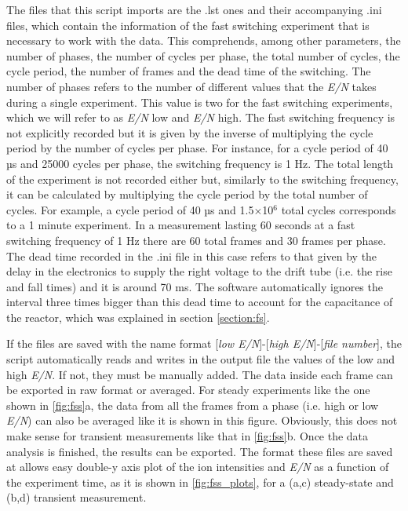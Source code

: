 The files that this script imports are the .lst ones and their accompanying .ini files, which contain the information of the fast switching experiment that is necessary to work with the data.
This  comprehends, among other parameters,
the number of phases,
the number of cycles per phase,
the total number of cycles,
the cycle period,
the number of frames
and
the dead time of the switching.
The number of phases refers to the number of different values that the \textit{E/N} takes during a single experiment. This value is two for the fast switching experiments, which we will refer to as \textit{E/N} low  and \textit{E/N} high.
%
The fast switching frequency is not explicitly recorded but it is given by the inverse of multiplying the cycle period by the number of cycles per phase. For instance, for a cycle period of 40 µs and 25000 cycles per phase, the switching frequency is 1 Hz.
%
The total length of the experiment is not recorded either but, similarly to the switching frequency, it can be calculated by multiplying the cycle period by the total number of cycles. For example, a cycle period of 40 µs and 1.5$\times$10$^6$ total cycles corresponds to a 1 minute experiment.
%
%
In a measurement lasting 60 seconds at a fast switching frequency of 1 Hz there are 60 total frames and 30 frames per phase.
%
%
The dead time recorded in the .ini file in this case refers to that given by the delay in the electronics to supply the right voltage to the drift tube (i.e. the rise and fall times) and it is around 70 ms. The software automatically ignores the interval three times bigger than this dead time to account for the capacitance of the reactor, which was explained  in section \ref{section:fs}.




If the files are saved with the name format [\textit{low E/N}]-[\textit{high E/N}]-[\textit{file number}], the script automatically reads and writes in the output file the values of the low and high \textit{E/N}. If not, they must be manually added.
%
The data inside each frame can be exported in raw format or averaged.
For steady experiments like the one shown in \autoref{fig:fss}a, the data from all the frames from a phase (i.e. high or low \textit{E/N}) can also be averaged like it is shown in this figure. Obviously, this does not make sense for transient measurements like that in \autoref{fig:fss}b.
%
Once the data analysis is finished, the results can be exported. The format these files are saved at allows easy double-y axis plot of the ion intensities and \textit{E/N} as a function of the experiment time, as it is shown in \autoref{fig:fss_plots}, for a (a,c) steady-state  and (b,d) transient measurement.




